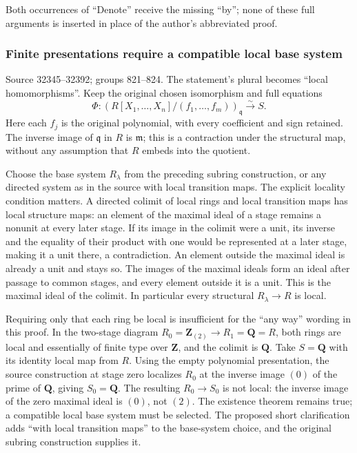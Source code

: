 Both occurrences of ``Denote'' receive the missing ``by''; none of these full arguments is inserted in place of the author's abbreviated proof.

\subsubsection{Finite presentations require a compatible local base system}\label{finite-presentations-require-a-compatible-local-base-system}

Source 32345--32392; groups 821--824. The statement's plural becomes ``local homomorphisms''. Keep the original chosen isomorphism and full equations \[
\Phi:(R[X_1,\ldots,X_n]/(f_1,\ldots,f_m))_{\mathfrak q}\xrightarrow{\sim}S.
\] Here each \(f_j\) is the original polynomial, with every coefficient and sign retained. The inverse image of \(\mathfrak q\) in \(R\) is \(\mathfrak m\); this is a contraction under the structural map, without any assumption that \(R\) embeds into the quotient.

Choose the base system \(R_\lambda\) from the preceding subring construction, or any directed system as in the source with local transition maps. The explicit locality condition matters. A directed colimit of local rings and local transition maps has local structure maps: an element of the maximal ideal of a stage remains a nonunit at every later stage. If its image in the colimit were a unit, its inverse and the equality of their product with one would be represented at a later stage, making it a unit there, a contradiction. An element outside the maximal ideal is already a unit and stays so. The images of the maximal ideals form an ideal after passage to common stages, and every element outside it is a unit. This is the maximal ideal of the colimit. In particular every structural \(R_\lambda\to R\) is local.

Requiring only that each ring be local is insufficient for the ``any way'' wording in this proof. In the two-stage diagram \(R_0=\mathbf Z_{(2)}\to R_1=\mathbf Q=R\), both rings are local and essentially of finite type over \(\mathbf Z\), and the colimit is \(\mathbf Q\). Take \(S=\mathbf Q\) with its identity local map from \(R\). Using the empty polynomial presentation, the source construction at stage zero localizes \(R_0\) at the inverse image \((0)\) of the prime of \(\mathbf Q\), giving \(S_0=\mathbf Q\). The resulting \(R_0\to S_0\) is not local: the inverse image of the zero maximal ideal is \((0)\), not \((2)\). The existence theorem remains true; a compatible local base system must be selected. The proposed short clarification adds ``with local transition maps'' to the base-system choice, and the original subring construction supplies it.

